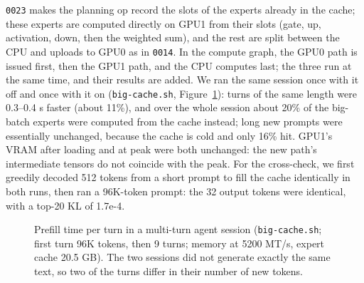 \documentclass[11pt,a4paper]{article}
\newcommand{\code}[1]{\texttt{#1}}
\begin{document}
\code{0023} makes the planning op record the slots of the experts already in the cache; these experts are computed directly on GPU1 from their slots (gate, up, activation, down, then the weighted sum), and the rest are split between the CPU and uploads to GPU0 as in \code{0014}. In the compute graph, the GPU0 path is issued first, then the GPU1 path, and the CPU computes last; the three run at the same time, and their results are added. We ran the same session once with it off and once with it on (\code{big-cache.sh}, Figure~\ref{fig:bigcache}): turns of the same length were 0.3--0.4 s faster (about 11\%), and over the whole session about 20\% of the big-batch experts were computed from the cache instead; long new prompts were essentially unchanged, because the cache is cold and only 16\% hit. GPU1's VRAM after loading and at peak were both unchanged: the new path's intermediate tensors do not coincide with the peak. For the cross-check, we first greedily decoded 512 tokens from a short prompt to fill the cache identically in both runs, then ran a 96K-token prompt: the 32 output tokens were identical, with a top-20 KL of 1.7e-4.

\begin{figure}[t]
  \centering
  \caption{Prefill time per turn in a multi-turn agent session (\code{big-cache.sh}; first turn 96K tokens, then 9 turns; memory at 5200 MT/s, expert cache 20.5 GB). The two sessions did not generate exactly the same text, so two of the turns differ in their number of new tokens.}
  \label{fig:bigcache}
\end{figure}
\end{document}
